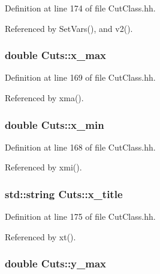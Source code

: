 Definition at line 174 of file Cut\-Class.\-hh.



Referenced by Set\-Vars(), and v2().

\subsubsection[{x\-\_\-max}]{\setlength{\rightskip}{0pt plus 5cm}double Cuts\-::x\-\_\-max\hspace{0.3cm}{\ttfamily [private]}}\label{classCuts_a38827082987aebf38960f33ce7a16429}


Definition at line 169 of file Cut\-Class.\-hh.



Referenced by xma().

\subsubsection[{x\-\_\-min}]{\setlength{\rightskip}{0pt plus 5cm}double Cuts\-::x\-\_\-min\hspace{0.3cm}{\ttfamily [private]}}\label{classCuts_a4e3e41f16721b728c361b5214609acbc}


Definition at line 168 of file Cut\-Class.\-hh.



Referenced by xmi().

\subsubsection[{x\-\_\-title}]{\setlength{\rightskip}{0pt plus 5cm}std\-::string Cuts\-::x\-\_\-title\hspace{0.3cm}{\ttfamily [private]}}\label{classCuts_af1a4af3816d627a9f2bfcc9ee4a08489}


Definition at line 175 of file Cut\-Class.\-hh.



Referenced by xt().

\subsubsection[{y\-\_\-max}]{\setlength{\rightskip}{0pt plus 5cm}double Cuts\-::y\-\_\-max\hspace{0.3cm}{\ttfamily [private]}}\label{classCuts_afecd199b8235871d84319eced64a134e}


